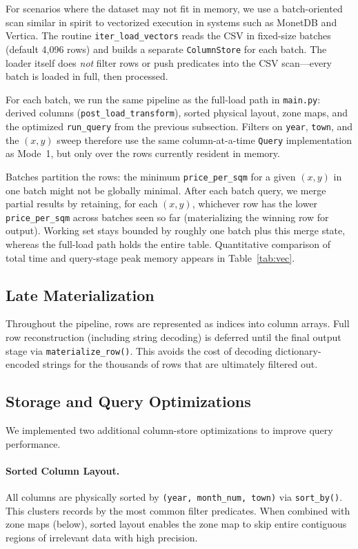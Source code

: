 \documentclass[11pt,a4paper]{article}
\begin{document}
For scenarios where the dataset may not fit in memory, we use a batch-oriented scan similar in spirit to vectorized execution in systems such as MonetDB and Vertica. The routine \texttt{iter\_load\_vectors} reads the CSV in fixed-size batches (default 4,096 rows) and builds a separate \texttt{ColumnStore} for each batch. The loader itself does \emph{not} filter rows or push predicates into the CSV scan---every batch is loaded in full, then processed.

For each batch, we run the same pipeline as the full-load path in \texttt{main.py}: derived columns (\texttt{post\_load\_transform}), sorted physical layout, zone maps, and the optimized \texttt{run\_query} from the previous subsection. Filters on \texttt{year}, \texttt{town}, and the $(x,y)$ sweep therefore use the same column-at-a-time \texttt{Query} implementation as Mode~1, but only over the rows currently resident in memory.

Batches partition the rows: the minimum \texttt{price\_per\_sqm} for a given $(x,y)$ in one batch might not be globally minimal. After each batch query, we merge partial results by retaining, for each $(x,y)$, whichever row has the lower \texttt{price\_per\_sqm} across batches seen so far (materializing the winning row for output). Working set stays bounded by roughly one batch plus this merge state, whereas the full-load path holds the entire table. Quantitative comparison of total time and query-stage peak memory appears in Table~\ref{tab:vec}.

\subsection{Late Materialization}

Throughout the pipeline, rows are represented as indices into column arrays. Full row reconstruction (including string decoding) is deferred until the final output stage via \texttt{materialize\_row()}. This avoids the cost of decoding dictionary-encoded strings for the thousands of rows that are ultimately filtered out.

\subsection{Storage and Query Optimizations}

We implemented two additional column-store optimizations to improve query performance.

\paragraph{Sorted Column Layout.}
All columns are physically sorted by \texttt{(year, month\_num, town)} via \texttt{sort\_by()}. This clusters records by the most common filter predicates. When combined with zone maps (below), sorted layout enables the zone map to skip entire contiguous regions of irrelevant data with high precision.
\end{document}
